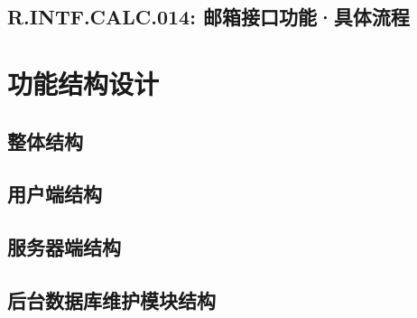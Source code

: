     \subsection{R.INTF.CALC.014: 邮箱接口功能·具体流程}
\section{功能结构设计}
    \subsection{整体结构}
    
    \subsection{用户端结构}
    \subsection{服务器端结构}
    \subsection{后台数据库维护模块结构}
